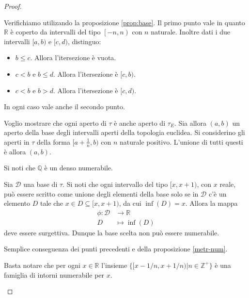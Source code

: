 \documentclass{article}
\begin{document}
\begin{proof}
    \begin{nlist}
        \item Verifichiamo utilizando la proposizione \ref{prop:base}. Il primo
        punto vale in quanto $\mathbb{R}$ \`e coperto da intervalli del tipo
        $\left[-n, n\right)$ con $n$ naturale. Inoltre dati i due intervalli
        $[a,b)$ e $[c,d)$, distinguo:
        \begin{itemize}
            \item $b\leq c$. Allora l'itersezione \`e vuota.
            \item $c < b$ e $b \leq d$. Allora l'itersezione \`e $[c,b)$.
            \item $c < b$ e $b > d$. Allora l'itersezione \`e $[c,d)$.
        \end{itemize}
        In ogni caso vale anche il secondo punto.

        \item Voglio mostrare che ogni aperto di $\tau$ \`e anche aperto di
        $\tau_E$. Sia allora $(a, b)$ un aperto della base degli intervalli
        aperti della topologia euclidea. Si considerino gli aperti in $\tau$
        della forma $[a+\frac{1}{n},b)$ con $n$ naturale positivo. L'unione di
        tutti questi \`e allora $(a,b)$.

        \item Si noti che $\mathbb{Q}$ \`e un denso numerabile.

        \item Sia $\mathcal{D}$ una base di $\tau$. Si noti che ogni intervallo
        del tipo $[x,x+1)$, con $x$ reale, pu\`o essere scritto come unione degli
        elementi della base solo se in $\mathcal{D}$ c'\`e un elemento $D$ tale
        che $x \in D \subseteq [x, x+1)$, da cui $\inf(D) = x$. Allora la mappa
        \begin{align*}
            \phi:\mathcal{D}&\to \mathbb{R}\\
            D & \mapsto \inf(D)
        \end{align*}
        deve essere surgettiva. Dunque la base scelta non pu\`o essere
        numerabile.

        \item Semplice conseguenza dei punti precedenti e della proposizione
        \ref{metr-num}.

				\item Basta notare che per ogni $x \in \mathbb{R}$ l'insieme $\{ [x-1/n, x+1/n) | n \in \mathbb{Z}^+\}$ è una famiglia di intorni numerabile per $x$.
    \end{nlist}
\end{proof}
\end{document}
